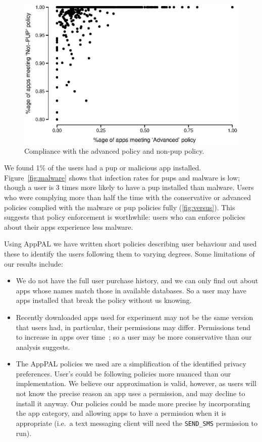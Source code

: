 \documentclass[]{llncs}
\begin{document}
\begin{figure}\centering
  \includegraphics[width=0.5\linewidth]{./figures/c_v_pup.eps}
  \caption{Compliance with the advanced policy and non-\ac{pup} policy.}
  \label{fig:versus}
\end{figure}

We found 1\% of the users had a \ac{pup} or malicious app installed.
Figure~\ref{fig:malware} shows that infection rates for \ac{pup}s and malware is low;
though a user is 3 times more likely to have a \ac{pup} installed than malware.
Users who were complying more than half the time with the conservative or advanced policies complied with the malware or \ac{pup} policies fully (\autoref{fig:versus}).
This suggests that policy enforcement is worthwhile: users who can enforce policies about their apps experience less malware.

Using AppPAL we have written short policies describing user behaviour and used these to identify the users following them to varying degrees.
Some limitations of our results include:
\begin{itemize}
\item
  We do not have the full user purchase history, and we can only find out about apps whose names match those in available databases.
  So a user may have apps installed that break the policy without us knowing.
\item
  Recently downloaded apps used for experiment may not be the same version that users had, in particular, their permissions may differ.
  Permissions tend to increase in apps over time~\cite{Wei:2012id}; so a user may be more conservative than our analysis suggests.
\item
  The AppPAL policies we used are a simplification of the identified privacy preferences.
  User's could be following policies more nuanced than our implementation.
  We believe our approximation is valid, however, as users will not know the precise reason an app uses a permission, and may decline to install it anyway.
  Our policies could be made more precise by incorporating the app category, and allowing apps to have a permission when it is appropriate (i.e.~a text messaging client will need the \texttt{SEND\_SMS} permission to run).
\end{itemize}
\end{document}
